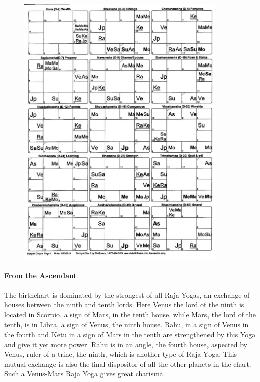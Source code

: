  \begin{figure}[h]
\centering
\includegraphics[width=10cm]{pics/Deepak-Chopra2.jpg}
\caption{}
\end{figure}

 

\paragraph{From the Ascendant}

 

The birthchart is dominated by the strongest of all Raja Yogas, an exchange of houses between the ninth and tenth lords. Here Venus the lord of the ninth is located in Scorpio, a sign of Mars, in the tenth house, while Mars, the lord of the tenth, is in Libra, a sign of Venus, the ninth house. Rahu, in a sign of Venus in the fourth and Ketu in a sign of Mars in the tenth are strengthened by this Yoga and give it yet more power. Rahu is in an angle, the fourth house, aspected by Venus, ruler of a trine, the ninth, which is another type of Raja Yoga. This mutual exchange is also the final dispositor of all the other planets in the chart. Such a Venus-Mars Raja Yoga gives great charisma.


